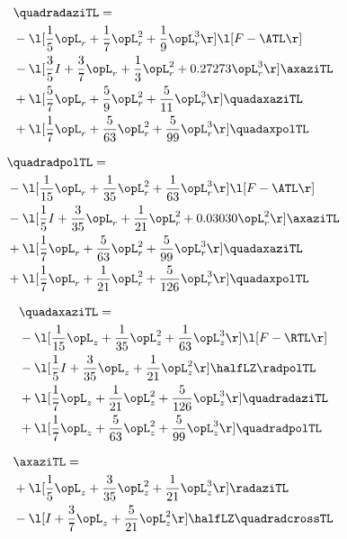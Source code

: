 \begin{alignat}{2} 
\label{eq:quadradaziTL_0} 
& \quadradaziTL = \\ 
& - \l[ \frac{1}{5} \opL_r + \frac{1}{7} \opL_r^{2} + \frac{1}{9} \opL_r^{3}  \r] \l[ F - \ATL \r] \nonumber \\ 
& - \l[ \frac{3}{5} I + \frac{3}{7} \opL_r + \frac{1}{3} \opL_r^{2} +  0.27273 \opL_r^{3}  \r] \axaziTL \nonumber \\ 
& + \l[ \frac{5}{7} \opL_r + \frac{5}{9} \opL_r^{2} + \frac{5}{11} \opL_r^{3}  \r] \quadaxaziTL \nonumber \\ 
& + \l[ \frac{1}{7} \opL_r + \frac{5}{63} \opL_r^{2} + \frac{5}{99} \opL_r^{3}  \r] \quadaxpolTL \nonumber \\ 
\end{alignat} 


\begin{alignat}{2} 
\label{eq:quadradpolTL_0} 
& \quadradpolTL = \\ 
& - \l[ \frac{1}{15} \opL_r + \frac{1}{35} \opL_r^{2} + \frac{1}{63} \opL_r^{3}  \r] \l[ F - \ATL \r] \nonumber \\ 
& - \l[ \frac{1}{5} I + \frac{3}{35} \opL_r + \frac{1}{21} \opL_r^{2} +  0.03030 \opL_r^{2}  \r] \axaziTL \nonumber \\ 
& + \l[ \frac{1}{7} \opL_r + \frac{5}{63} \opL_r^{2} + \frac{5}{99} \opL_r^{3}  \r] \quadaxaziTL \nonumber \\ 
& + \l[ \frac{1}{7} \opL_r + \frac{1}{21} \opL_r^{2} + \frac{5}{126} \opL_r^{3}  \r] \quadaxpolTL \nonumber \\ 
\end{alignat} 


\begin{alignat}{2} 
\label{eq:quadaxaziTL_0} 
& \quadaxaziTL = \\ 
& - \l[ \frac{1}{15} \opL_z + \frac{1}{35} \opL_z^{2} + \frac{1}{63} \opL_z^{3}  \r] \l[ F - \RTL \r] \nonumber \\ 
& - \l[ \frac{1}{5} I + \frac{3}{35} \opL_z + \frac{1}{21} \opL_z^{2}  \r] \halfLZ \radpolTL \nonumber \\ 
& + \l[ \frac{1}{7} \opL_z + \frac{1}{21} \opL_z^{2} + \frac{5}{126} \opL_z^{3}  \r] \quadradaziTL \nonumber \\ 
& + \l[ \frac{1}{7} \opL_z + \frac{5}{63} \opL_z^{2} + \frac{5}{99} \opL_z^{3}  \r] \quadradpolTL \nonumber \\ 
\end{alignat} 


\begin{alignat}{2} 
\label{eq:linaxaziTL_0} 
& \axaziTL = \\ 
& + \l[ \frac{1}{5} \opL_z + \frac{3}{35} \opL_z^{2} + \frac{1}{21} \opL_z^{3}  \r] \radaziTL \nonumber \\ 
& - \l[ I + \frac{3}{7} \opL_z + \frac{5}{21} \opL_z^{2}  \r] \halfLZ \quadradcrossTL \nonumber \\ 
\end{alignat} 


